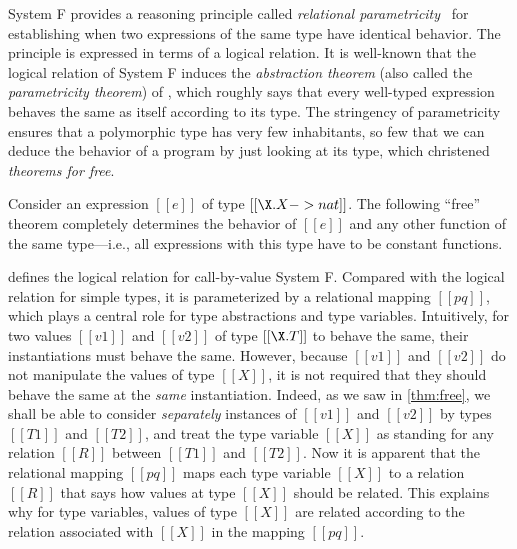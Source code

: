 System F provides a reasoning principle called \emph{relational
  parametricity}~\citep{reynolds1983types} for establishing when two expressions
of the same type have identical behavior. The principle is expressed in terms of
a logical relation. It is well-known that the logical relation of System F
induces the \emph{abstraction theorem} (also called the \emph{parametricity
  theorem}) of \citet{reynolds1983types}, which roughly says that every
well-typed expression behaves the same as itself according to its type. The
stringency of parametricity ensures that a polymorphic type has very few
inhabitants, so few that we can deduce the behavior of a program by just looking
at its type, which \citet{wadler1989theorems} christened \emph{theorems for free}.

Consider an expression $[[e]]$ of type $[[ \X . X -> nat ]]$. The following
``free'' theorem completely determines the behavior of $[[e]]$ and any other
function of the same type---i.e., all expressions with this type have to be constant
functions.



 defines the logical relation for call-by-value System F.
Compared with the logical relation for simple types, it is parameterized by a
relational mapping $[[pq]]$, which plays a central role for type abstractions
and type variables. Intuitively, for two values $[[v1]]$ and $[[v2]]$ of type
$[[\X . T]]$ to behave the same, their instantiations must behave the same.
However, because $[[v1]]$ and $[[v2]]$ do not manipulate the values of type
$[[X]]$, it is not required that they should behave the same at the
\emph{same} instantiation. Indeed, as we saw in \cref{thm:free}, we shall be
able to consider \emph{separately} instances of $[[v1]]$ and $[[v2]]$ by types
$[[T1]]$ and $[[T2]]$, and treat the type variable $[[X]]$ as standing for any
relation $[[R]]$ between $[[T1]]$ and $[[T2]]$. Now it is apparent that the
relational mapping $[[pq]]$ maps each type variable $[[X]]$ to a relation
$[[R]]$ that says how values at type $[[X]]$ should be related. This explains
why for type variables, values of type $[[X]]$ are related according to the
relation associated with $[[X]]$ in the mapping $[[pq]]$.



